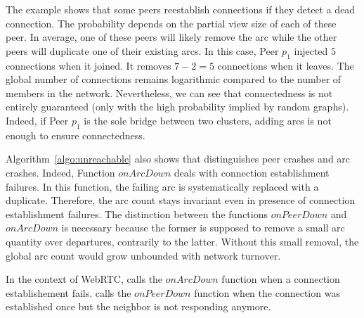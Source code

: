 The example shows that some peers reestablish connections if they detect a dead
connection. The probability depends on the partial view size of each of these
peer. In average, one of these peers will likely remove the arc while the other
peers will duplicate one of their existing arcs. In this case, Peer $p_1$
injected $5$ connections when it joined. It removes $7-2 =5 $ connections when
it leaves. The global number of connections remains logarithmic compared to the
number of members in the network. Nevertheless, we can see that connectedness
is not entirely guaranteed (only with the high probability implied by random
graphs). Indeed, if Peer $p_1$ is the sole bridge between two clusters, adding
arcs is not enough to ensure connectedness.

Algorithm~\ref{algo:unreachable} also shows that \SPRAY distinguishes peer
crashes and arc crashes. Indeed, Function $onArcDown$ deals with connection
establishment failures. In this function, the failing arc is systematically
replaced with a duplicate. Therefore, the arc count stays invariant even in
presence of connection establishment failures. The distinction between the
functions $onPeerDown$ and $onArcDown$ is necessary because the former is
supposed to remove a small arc quantity over departures, contrarily to the
latter. Without this small removal, the global arc count would grow unbounded
with network turnover.

In the context of WebRTC, \SPRAY calls the $onArcDown$ function when a connection
establishement fails. \SPRAY calls the $onPeerDown$ function when the
connection was established once but the neighbor is not responding anymore.



